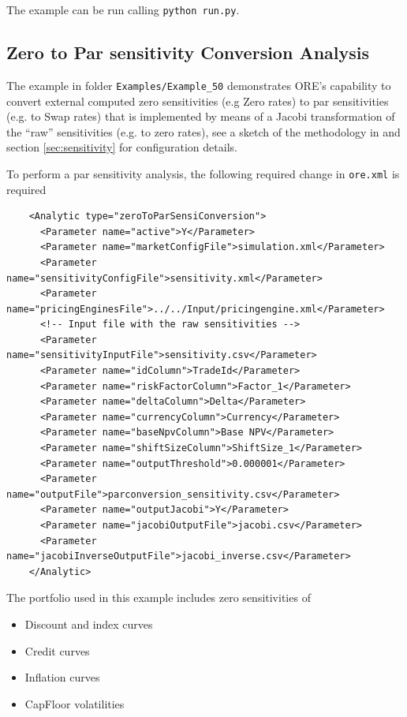 The example can be run calling {\tt python run.py}.


\subsection{Zero to Par sensitivity Conversion Analysis}%
\label{example:50}

The example in folder {\tt Examples/Example\_50} demonstrates ORE's capability to convert external computed zero sensitivities (e.g Zero rates) to par sensitivities (e.g. to Swap rates)
that is implemented  by means of a Jacobi transformation of the ``raw'' sensitivities (e.g. to zero rates), see a sketch of the
methodology in \cite{methods} and section \ref{sec:sensitivity} for configuration details.

To perform a par sensitivity analysis, the following required change in {\tt ore.xml} is required

\begin{verbatim}
    <Analytic type="zeroToParSensiConversion">
      <Parameter name="active">Y</Parameter>
      <Parameter name="marketConfigFile">simulation.xml</Parameter>
      <Parameter name="sensitivityConfigFile">sensitivity.xml</Parameter>
      <Parameter name="pricingEnginesFile">../../Input/pricingengine.xml</Parameter>
	  <!-- Input file with the raw sensitivities -->
      <Parameter name="sensitivityInputFile">sensitivity.csv</Parameter>
      <Parameter name="idColumn">TradeId</Parameter>
      <Parameter name="riskFactorColumn">Factor_1</Parameter>
      <Parameter name="deltaColumn">Delta</Parameter>
	  <Parameter name="currencyColumn">Currency</Parameter>
	  <Parameter name="baseNpvColumn">Base NPV</Parameter>
 	  <Parameter name="shiftSizeColumn">ShiftSize_1</Parameter>
      <Parameter name="outputThreshold">0.000001</Parameter>
      <Parameter name="outputFile">parconversion_sensitivity.csv</Parameter>
      <Parameter name="outputJacobi">Y</Parameter>
      <Parameter name="jacobiOutputFile">jacobi.csv</Parameter>
      <Parameter name="jacobiInverseOutputFile">jacobi_inverse.csv</Parameter>
    </Analytic>
\end{verbatim}

The portfolio used in this example includes zero sensitivities of
\begin{itemize}
\item Discount and index curves
\item Credit curves
\item Inflation curves
\item CapFloor volatilities
\end{itemize}

